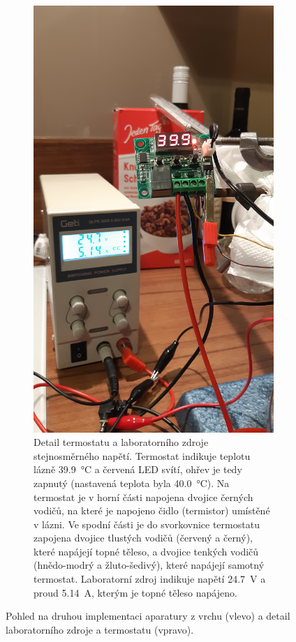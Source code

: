 \documentclass[12pt]{article}
\begin{document}
\begin{figure}[h!]
\begin{subfigure}[t]{.45\textwidth}
    \end{subfigure}
    \hfill
    \begin{subfigure}[t]{.45\textwidth}
        \includegraphics[angle = 270, width = \textwidth]{prilohy/elektro.jpg}
        \caption{Detail termostatu a laboratorního zdroje stejnosměrného napětí. Termostat indikuje teplotu lázně \SI{39,9}{\degreeCelsius} a červená LED svítí, ohřev je tedy zapnutý (nastavená teplota byla \SI{40,0}{\degreeCelsius}). Na termostat je v horní části napojena dvojice černých vodičů, na které je napojeno čidlo (termistor) umístěné v lázni. Ve spodní části je do svorkovnice termostatu zapojena dvojice tlustých vodičů (červený a černý), které napájejí topné těleso, a dvojice tenkých vodičů (hnědo-modrý a žluto-šedivý), které napájejí samotný termostat. Laboratorní zdroj indikuje napětí \SI{24,7}{\volt} a proud \SI{5,14}{\ampere}, kterým je topné těleso napájeno.}
    \end{subfigure}
    \caption{Pohled na druhou implementaci aparatury z vrchu (vlevo) a detail laboratorního zdroje a termostatu (vpravo).}
    \label{fig:elektro}
\end{figure}
\end{document}
